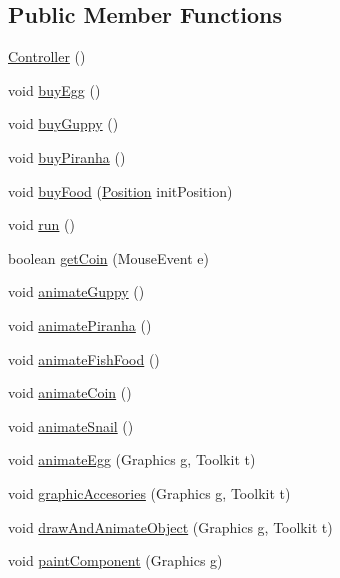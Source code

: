 \subsection*{Public Member Functions}
\begin{DoxyCompactItemize}
\item 
\mbox{\hyperlink{class_controller_a01483f901cb33bf522ceab23a32e56f2}{Controller}} ()
\item 
void \mbox{\hyperlink{class_controller_a278f0ba8f8978834619465f1eb357175}{buy\+Egg}} ()
\item 
void \mbox{\hyperlink{class_controller_adb93f92dca6e1d48d61d811411945aff}{buy\+Guppy}} ()
\item 
void \mbox{\hyperlink{class_controller_aeea16d5cb5dc9ea882583b621c1205f9}{buy\+Piranha}} ()
\item 
void \mbox{\hyperlink{class_controller_a40a60157abffab52f9170ffb6579151e}{buy\+Food}} (\mbox{\hyperlink{class_position}{Position}} init\+Position)
\item 
void \mbox{\hyperlink{class_controller_a2fcfd8c4d229d4deeec470de95567805}{run}} ()
\item 
boolean \mbox{\hyperlink{class_controller_a42fbd01fdeefdf2f40f85230f40d8be8}{get\+Coin}} (Mouse\+Event e)
\item 
void \mbox{\hyperlink{class_controller_ac950a5d811e4f3d266e8952e0140faa0}{animate\+Guppy}} ()
\item 
void \mbox{\hyperlink{class_controller_a4a6a2af6faf89e4bc96bac2dc8b190f4}{animate\+Piranha}} ()
\item 
void \mbox{\hyperlink{class_controller_ac9f6dcbe9113ca383adf751261c2a8d3}{animate\+Fish\+Food}} ()
\item 
void \mbox{\hyperlink{class_controller_a2996989c163af44339ea43f597b77115}{animate\+Coin}} ()
\item 
void \mbox{\hyperlink{class_controller_a76a0629c8b8af69dfbf0cead4e6d04c3}{animate\+Snail}} ()
\item 
void \mbox{\hyperlink{class_controller_a04e239635c1b5ca996b74498c373626b}{animate\+Egg}} (Graphics g, Toolkit t)
\item 
void \mbox{\hyperlink{class_controller_af6b9d4cd41e5bb90f04c0f61f5cfcd2d}{graphic\+Accesories}} (Graphics g, Toolkit t)
\item 
void \mbox{\hyperlink{class_controller_afcc995c6e49e732f0542a4dee21921d2}{draw\+And\+Animate\+Object}} (Graphics g, Toolkit t)
\item 
void \mbox{\hyperlink{class_controller_a3d48c05f5876d46347a4b22f3d6d5a1a}{paint\+Component}} (Graphics g)
\end{DoxyCompactItemize}
